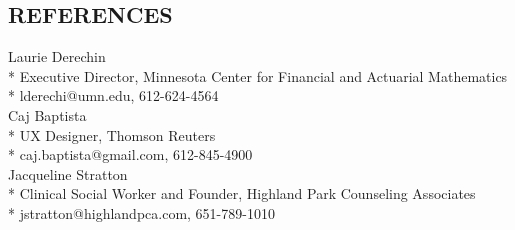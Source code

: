 \documentclass[line,margin]{res}
\begin{document}

\address{3301 Elliot Ave S. Apt 1, Minneapolis, MN 55407}
\address{deisum@gmail.com 612.205.9789}
 
\begin{resume}
\vspace{5 mm} 
\section{REFERENCES}
    Laurie Derechin
    \\* Executive Director, Minnesota Center for Financial and Actuarial Mathematics
    \\* lderechi@umn.edu, 612-624-4564
    \vspace{1.5 mm}
    \\ Caj Baptista
    \\* UX Designer, Thomson Reuters
    \\* caj.baptista@gmail.com, 612-845-4900
    \vspace{1.5 mm}
    \\ Jacqueline Stratton
    \\* Clinical Social Worker and Founder, Highland Park Counseling Associates
    \\* jstratton@highlandpca.com, 651-789-1010

\end{resume}
\end{document}
